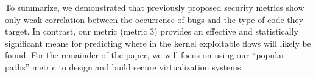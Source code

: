 To summarize, we demonstrated that previously proposed security
metrics show only weak correlation between the occurrence of bugs
and the type of code they target. In contrast, our metric (metric 3)
provides an effective and statistically significant
means for predicting where in the kernel exploitable flaws
will likely be found. For the remainder of the paper, we will
focus on using our ``popular paths'' metric to design and build secure virtualization systems.
